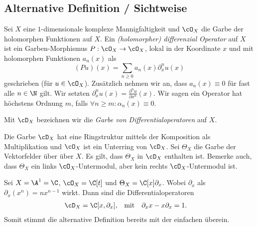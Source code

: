 \subsection{Alternative Definition / Sichtweise}
\begin{comment}
Nur abgeschrieben
\end{comment}
\cite[Chap 1.1.]{kashiwara2003d}
Sei $X$ eine $1$-dimensionale komplexe Mannigfaltigkeit und $\cO_X$ die Garbe
der holomorphen Funktionen auf $X$. Ein \emph{(holomorpher) differenzial
Operator} auf $X$ ist ein Garben-Morphismus $P:\cO_X\rightarrow \cO_X$, lokal
in der Koordinate $x$ und mit holomorphen Funktionen $a_n(x)$ als
\[
(Pu)(x)=\sum_{n\geq0}a_n(x)\partial_x^nu(x)
\]
geschrieben (für $u\in\cO_X$). Zusätzlich nehmen wir an, dass $a_n(x)\equiv 0$
für fast alle $n\in \N$ gilt. Wir setzten
$\partial_x^nu(x)=\frac{\partial^nu}{\partial x^n}(x)$. Wir sagen ein Operator
hat höchstens Ordnung $m$, falls $\forall n\geq m: \alpha_n(x)\equiv0$.
\begin{defn}
Mit $\cD_X$ bezeichnen wir die \emph{Garbe von Differentialoperatoren} auf $X$.
\end{defn}
Die Garbe $\cD_X$ hat eine Ringstruktur mittels der Komposition als
Multiplikation und $\cO_X$ ist ein Unterring von $\cD_X$. Sei $\Theta_X$ die
Garbe der Vektorfelder über über $X$. Es gilt, dass $\Theta_X$ in $\cD_X$
enthalten ist.  Bemerke auch, dass $\Theta_X$ ein links $\cO_X$-Untermodul,
aber kein rechts $\cO_X$-Untermodul ist.

\begin{prop}
\cite[Exmp 1.1]{ArkhipovDmod}
Sei $X=\A^1=\C$, $\cO_X=\C[t]$ und $\Theta_X=\C[x]\partial_x$. Wobei
$\partial_x$ als $\partial_x(x^n)=nx^{n-1}$ wirkt. Dann sind die
Differentialoperatoren
\begin{align*}
\cD_X &= \C[x,\partial_x], & \mbox{mit} & & \partial_x x-x\partial_x & =1.
\end{align*}
Somit stimmt die alternative Definition bereits mit der einfachen überein.
\end{prop}

\begin{comment}
\begin{defn} \cite[Defn 2.1]{ArkhipovDmod}
Sei $X=\A^1$, $\cO_X=\C[x]$ und $\cD_X=[x,\partial_x]$ mit der Relation
$[\partial_x,x]=1$. Dann definieren wir die links $\cD$-Moduln über $\A^1$ als
die $\C[x,\partial_x]$-Moduln. Sie werden geschrieben als $\cD-mod(\A^1)$
\end{defn}
\end{comment}

